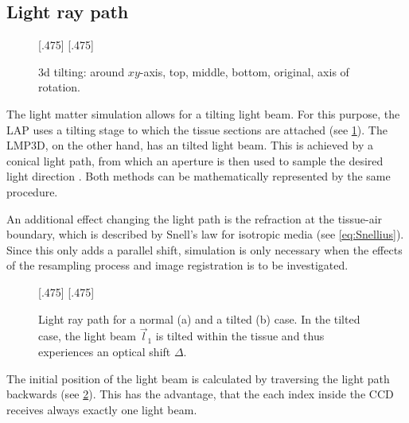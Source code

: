 \subsection{Light ray path}
\label{sec:pathOfLight}
%
\begin{figure}[!t]
\setlength{\tikzheight}{0.42\textwidth}
[.475\textwidth]{}\hfill
{}
[.475\textwidth]{}
\tikzset{external/export=false}
\caption[3d tilting]{3d tilting: around $xy$-axis, \raisebox{.25em}{\tikz \draw[red,thick](0,0)--(0.25,0);} top, \raisebox{.25em}{\tikz \draw[green,thick](0,0)--(0.25,0);} middle, \raisebox{.25em}{\tikz \draw[blue,thick](0,0)--(0.25,0);} bottom, \raisebox{.25em}{\tikz \draw[dash pattern=on 1.25pt off 1.25pt,thick](0,0)--(0.25,0);} original, \raisebox{.25em}{\tikz \draw[gray](0,0)--(0.25,0);} axis of rotation.}
\label{fig:tilting_camera_view}
\end{figure}
%
The light matter simulation allows for a tilting light beam.
For this purpose, the \ac{LAP} uses a tilting stage to which the tissue sections are attached (see \cref{fig:tilting_camera_view}).
The \ac{LMP3D}, on the other hand, has an tilted light beam.
This is achieved by a conical light path, from which an aperture is then used to sample the desired light direction \cite{Wiese:887678}.
Both methods can be mathematically represented by the same procedure.
\par
%
An additional effect changing the light path is the refraction at the tissue-air boundary, which is described by Snell's law for isotropic media (see \cref{eq:Snellius}).
Since this only adds a parallel shift, simulation is only necessary when the effects of the resampling process and image registration is to be investigated.
\par
%
\begin{figure}[!t]
\setlength{\tikzwidth}{0.45\textwidth}
[.475\textwidth]{
\def\tilt{0}
\def\nindex{2.25}
}\hfill
{}[.475\textwidth]{
}
\caption[Light path]{Light ray path for a normal (a) and a tilted (b) case. In the tilted case, the light beam $\vec{l}_1$ is tilted within the tissue and thus experiences an optical shift $\Delta$.}
\label{fig:tilted_side_view}
\end{figure}
%
The initial position of the light beam is calculated by traversing the light path backwards (see \cref{fig:tilted_side_view}).
This has the advantage, that the each index inside the \ac{CCD} receives always exactly one light beam.


